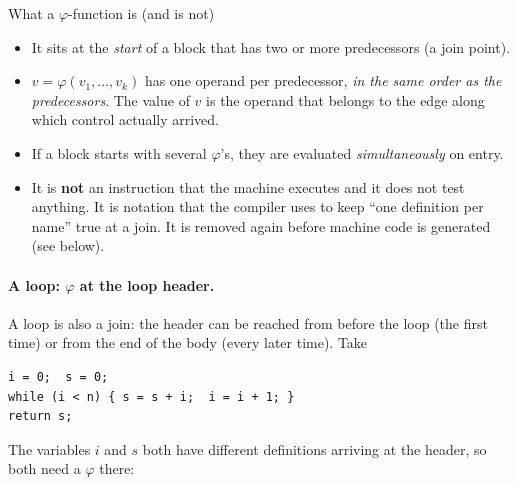 \documentclass[11pt,a4paper]{article}
\begin{document}
\begin{defbox}{What a $\varphi$-function is (and is not)}
\begin{itemize}[nosep]
\item It sits at the \emph{start} of a block that has two or more predecessors (a join point).
\item $v=\varphi(v_1,\dots,v_k)$ has one operand per predecessor, \emph{in the same order as the predecessors}. The value of $v$ is the operand that belongs to the edge along which control actually arrived.
\item If a block starts with several $\varphi$'s, they are evaluated \emph{simultaneously} on entry.
\item It is \textbf{not} an instruction that the machine executes and it does not test anything. It is notation that the compiler uses to keep ``one definition per name'' true at a join. It is removed again before machine code is generated (see below).
\end{itemize}
\end{defbox}

\paragraph{A loop: $\varphi$ at the loop header.} A loop is also a join: the header can be reached from before the loop (the first time) or from the end of the body (every later time). Take
\begin{lstlisting}
i = 0;  s = 0;
while (i < n) { s = s + i;  i = i + 1; }
return s;
\end{lstlisting}
The variables $i$ and $s$ both have different definitions arriving at the header, so both need a $\varphi$ there:
\end{document}
